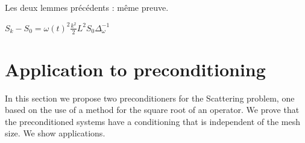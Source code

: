 \documentclass[]{article}
\begin{document}
Les deux lemmes précédents : même preuve.

\begin{Lem}
	$S_k - S_0 = \omega(t)^2\frac{k^2}{2}L^2 S_0 \Delta_{\omega}^{-1}$ 
\end{Lem}

\section{Application to preconditioning}

In this section we propose two preconditioners for the Scattering problem, one based on the use of a method for the square root of an operator. We prove that the preconditioned systems have a conditioning that is independent of the mesh size. We show applications. 



\end{document}
